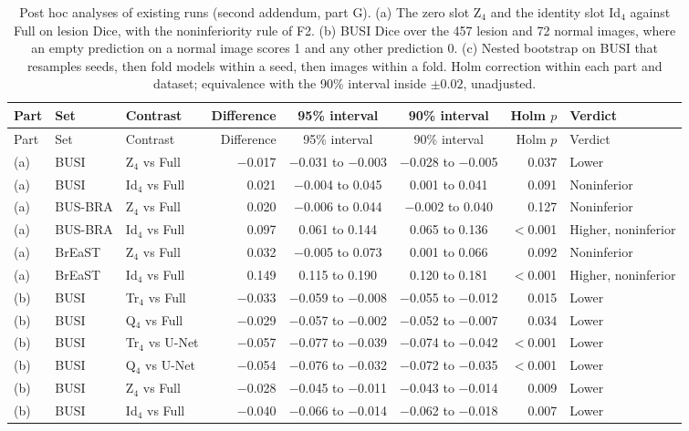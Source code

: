 \begin{longtable}{@{}lllrccrl@{}}
\caption{Post hoc analyses of existing runs (second addendum, part G). (a) The zero slot Z$_4$ and the identity slot Id$_4$ against Full on lesion Dice, with the noninferiority rule of F2. (b) BUSI Dice over the 457 lesion and 72 normal images, where an empty prediction on a normal image scores 1 and any other prediction 0. (c) Nested bootstrap on BUSI that resamples seeds, then fold models within a seed, then images within a fold. Holm correction within each part and dataset; equivalence with the 90\% interval inside $\pm0.02$, unadjusted.}\label{stab:rev3old}\\
\toprule
Part & Set & Contrast & Difference & 95\% interval & 90\% interval & Holm $p$ & Verdict \\
\midrule
\endfirsthead
\toprule
Part & Set & Contrast & Difference & 95\% interval & 90\% interval & Holm $p$ & Verdict \\
\midrule
\endhead
(a) & BUSI & Z$_4$ vs Full & $-$0.017 & $-$0.031 to $-$0.003 & $-$0.028 to $-$0.005 & 0.037 & Lower \\
(a) & BUSI & Id$_4$ vs Full & 0.021 & $-$0.004 to 0.045 & 0.001 to 0.041 & 0.091 & Noninferior \\
(a) & BUS-BRA & Z$_4$ vs Full & 0.020 & $-$0.006 to 0.044 & $-$0.002 to 0.040 & 0.127 & Noninferior \\
(a) & BUS-BRA & Id$_4$ vs Full & 0.097 & 0.061 to 0.144 & 0.065 to 0.136 & $<$0.001 & Higher, noninferior \\
(a) & BrEaST & Z$_4$ vs Full & 0.032 & $-$0.005 to 0.073 & 0.001 to 0.066 & 0.092 & Noninferior \\
(a) & BrEaST & Id$_4$ vs Full & 0.149 & 0.115 to 0.190 & 0.120 to 0.181 & $<$0.001 & Higher, noninferior \\
\midrule
(b) & BUSI & Tr$_4$ vs Full & $-$0.033 & $-$0.059 to $-$0.008 & $-$0.055 to $-$0.012 & 0.015 & Lower \\
(b) & BUSI & Q$_4$ vs Full & $-$0.029 & $-$0.057 to $-$0.002 & $-$0.052 to $-$0.007 & 0.034 & Lower \\
(b) & BUSI & Tr$_4$ vs U-Net & $-$0.057 & $-$0.077 to $-$0.039 & $-$0.074 to $-$0.042 & $<$0.001 & Lower \\
(b) & BUSI & Q$_4$ vs U-Net & $-$0.054 & $-$0.076 to $-$0.032 & $-$0.072 to $-$0.035 & $<$0.001 & Lower \\
(b) & BUSI & Z$_4$ vs Full & $-$0.028 & $-$0.045 to $-$0.011 & $-$0.043 to $-$0.014 & 0.009 & Lower \\
(b) & BUSI & Id$_4$ vs Full & $-$0.040 & $-$0.066 to $-$0.014 & $-$0.062 to $-$0.018 & 0.007 & Lower \\

\end{longtable}
